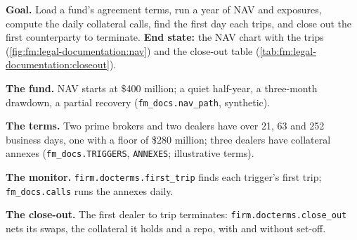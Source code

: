 \begin{tutorial}
\textbf{Goal.} Load a fund's agreement terms, run a year of NAV and exposures, compute the daily collateral calls, find the first day each  trips, and close out the first counterparty to terminate. \textbf{End state:} the NAV chart with the trips
(\cref{fig:fm:legal-documentation:nav}) and the close-out table (\cref{tab:fm:legal-documentation:closeout}).
\begin{tutsteps}
\item \textbf{The fund.} NAV starts at \$400 million; a quiet half-year, a three-month drawdown, a partial recovery
(\texttt{fm\_docs.nav\_path}, synthetic).
\item \textbf{The terms.} Two prime brokers and two dealers have  over 21, 63 and 252 business days, one with a floor of \$280
million; three dealers have collateral annexes (\texttt{fm\_docs.TRIGGERS}, \texttt{ANNEXES}; illustrative terms).
\item \textbf{The monitor.} \texttt{firm.docterms.first\_trip} finds each trigger's first trip; \texttt{fm\_docs.calls} runs the annexes daily.
\item \textbf{The close-out.} The first dealer to trip terminates: \texttt{firm.docterms.close\_out} nets its swaps, the collateral it holds and a
repo, with and without set-off.
\end{tutsteps}
\end{tutorial}

